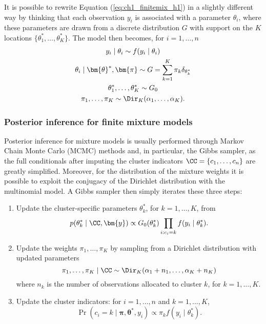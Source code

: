It is possible to rewrite Equation (\ref{eq:ch1_finitemix_h1}) in a slightly different way by thinking that each observation $y_i$ is associated with a parameter $\theta_i$, where these parameters are drawn from a discrete distribution $G$ with support on the $K$ locations $\{\theta^*_1,\dots,\theta^*_K\}$. The model then becomes, for $i=1,\dots,n$
\begin{equation}
\begin{gathered}
y_i \mid \theta_i \sim f(y_i\mid\theta_i)\\
\theta_i \mid \bm{\theta}^*,\bm{\pi} \sim G = \sum_{k=1}^K \pi_k \delta_{\theta^*_k}\\
\theta^*_1,\dots,\theta^*_K \sim G_0\\
\pi_1,\dots,\pi_K \sim \Dir_K(\alpha_1,\dots,\alpha_K).
\end{gathered}
\label{eq:ch1_finitemix_h2}
\end{equation}

\subsubsection*{Posterior inference for finite mixture models}
Posterior inference for mixture models is usually performed through Markov Chain Monte Carlo (MCMC) methods and, in particular, the Gibbs sampler, as the full conditionals after imputing the cluster indicators $\CC = \{c_1,\dots,c_n\}$ are greatly simplified.
Moreover, for the distribution of the mixture weights it is possible to exploit the conjugacy of the Dirichlet distribution with the multinomial model. A Gibbs sampler then simply iterates these three steps:
\begin{enumerate}
	\item Update the cluster-specific parameters $\theta^*_k$, for $k=1,\dots,K$, from
	$$ p(\theta^*_k \mid \CC, \bm{y}) \propto G_0(\theta^*_k) \prod_{i:c_i=k} f(y_i\mid\theta^*_{k}). $$
	\item Update the weights $\pi_1,\dots,\pi_K$ by sampling from a Dirichlet distribution with updated parameters
	$$ \pi_1,\dots,\pi_K\mid \CC \sim  \Dir_K(\alpha_1 + n_1,\dots,\alpha_K + n_K) $$
	where $n_k$ is the number of observations allocated to cluster $k$, for $k=1,\dots,K$.
	\item Update the cluster indicators: for $i=1,\dots,n$ and $k=1,\dots,K$,
	$$ \Pr(c_i = k\mid \bm{\pi},\bm{\theta}^*, y_i) \propto \pi_k f(y_i\mid\theta^*_{k})  .$$
\end{enumerate}



